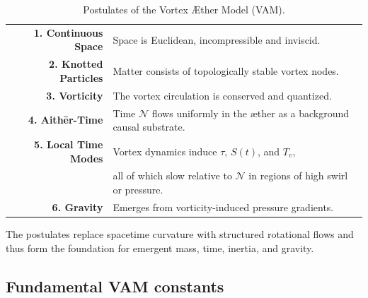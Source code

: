 \documentclass[preprint]{revtex4-2}
\begin{document}
\begin{table}[h!]
    \centering
    \begin{tabular}{rl}
        \midrule
        \hline
        \textbf{1. Continuous Space} & Space is Euclidean, incompressible and inviscid. \\
        \textbf{2. Knotted Particles} & Matter consists of topologically stable vortex nodes. \\
        \textbf{3. Vorticity} & The vortex circulation is conserved and quantized. \\
        \textbf{4. Aithēr-Time} & Time $\mathcal{N}$ flows uniformly in the æther as a background causal substrate. \\
        \textbf{5. Local Time Modes} & Vortex dynamics induce $\tau$, $S(t)$, and $T_v$,\\ & all of which slow relative to $\mathcal{N}$ in regions of high swirl or pressure. \\
        \textbf{6. Gravity} & Emerges from vorticity-induced pressure gradients. \\
        \hline
        \bottomrule
    \end{tabular}
    \caption{Postulates of the Vortex Æther Model (VAM).}
    \label{tab:postulates}
\end{table}

The postulates replace spacetime curvature with structured rotational flows and thus form the foundation for emergent mass, time, inertia, and gravity.

\subsection*{Fundamental VAM constants}
\end{document}
